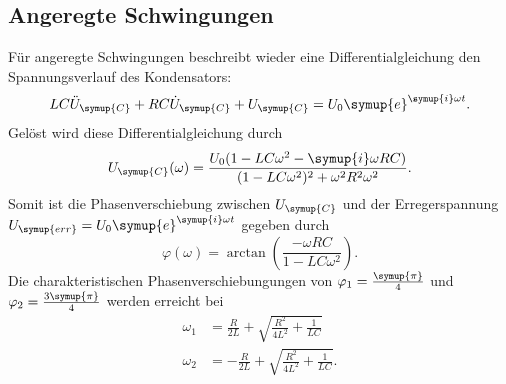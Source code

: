 \subsection{Angeregte Schwingungen}
Für angeregte Schwingungen beschreibt wieder eine Differentialgleichung den Spannungsverlauf des Kondensators:
\begin{equation*}
    LC\ddot{U}_{\symup{C}}+RC\dot{U}_{\symup{C}}+U_{\symup{C}} = U_0\symup{e}^{\symup{i}\omega t}.
\end{equation*}
Gelöst wird diese Differentialgleichung durch
\begin{equation*}
    U_{\symup{C}}(\omega)=\frac{U_0(1-LC\omega^2-\symup{i}\omega RC)}{(1-LC\omega^2)^{2}+\omega^2R^2\omega^2}.
\end{equation*}
Somit ist die Phasenverschiebung zwischen $U_{\symup{C}}$ und der Erregerspannung~$U_{\symup{err}}=U_0\symup{e}^{\symup{i}\omega t}$
gegeben durch
\begin{equation}
    \varphi(\omega)=\arctan\left(\frac{-\omega RC}{1-LC\omega^2}\right).
    \label{eq:Phasenverschiebung}
\end{equation}
Die charakteristischen Phasenverschiebungungen von $\varphi_1 = \frac{\symup{\pi}}{4}$ und $\varphi_2 = \frac{3\symup{\pi}}{4}$ werden erreicht bei
\begin{align}
    \omega_1&=\frac{R}{2L}+\sqrt{\frac{R^2}{4L^2}+\frac{1}{LC}} \label{eq:omega 1} \\
    \omega_2&=-\frac{R}{2L}+\sqrt{\frac{R^2}{4L^2}+\frac{1}{LC}}. \label{eq:omega 2}
\end{align}

